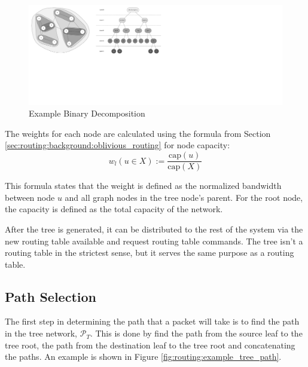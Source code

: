 \begin{landscape}
	\begin{figure}[p]
		\begin{centering}
			\includegraphics[width=8.5in]{Routing/Figures/routing-example_binary_decomposition.pdf}
			\caption{Example Binary Decomposition}
			\label{fig:routing:example_binary_decomposition}
		\end{centering}
	\end{figure}
\end{landscape}

The weights for each node are calculated using the formula from Section \ref{sec:routing:background:oblivious_routing} for node capacity:
\[
w_l(u\in X):=\frac{\textrm{cap}(u)}{\textrm{cap}(X)}
\]

This formula states that the weight is defined as the normalized bandwidth between node $u$ and all graph nodes in the tree node's parent. For the root node, the capacity is defined as the total capacity of the network.

After the tree is generated, it can be distributed to the rest of the system via the new routing table available and request routing table commands. The tree isn't a routing table in the strictest sense, but it serves the same purpose as a routing table.

\subsection{Path Selection}\label{sec:routing:methodology:path_selection}

The first step in determining the path that a packet will take is to find the path in the tree network, $\mathscr{P}_T $. This is done by find the path from the source leaf to the tree root, the path from the destination leaf to the tree root and concatenating the paths. An example is shown in Figure \ref{fig:routing:example_tree_path}.

